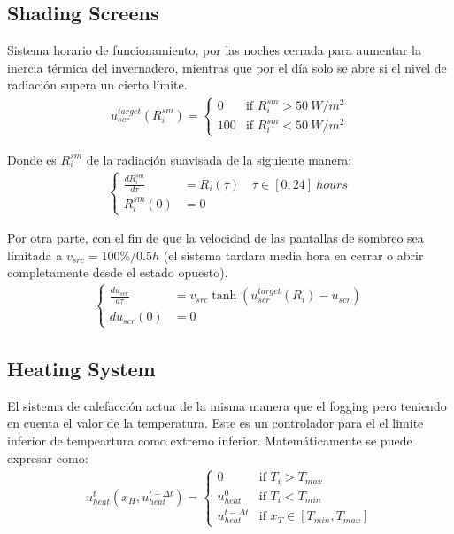 \documentclass{article}
\begin{document}
\subsection{Shading Screens} 

Sistema horario de funcionamiento, por las noches cerrada para aumentar la inercia térmica del invernadero, mientras que por el día solo se abre si el nivel de radiación supera un cierto límite.
\begin{gather}
    u_{scr}^{target}(R_i^{sm}) = \begin{cases}
        0      & \text{if }R_i^{sm} > 50 \ W/m^2 \\
        100   & \text{if }R_i^{sm}  < 50 \ W/m^2 
    \end{cases} 
\end{gather}

Donde es $R_i^{sm}$ de la radiación suavisada de la siguiente manera:
\begin{gather}
    \begin{cases}
        \displaystyle \frac{dR_i^{sm}}{d\tau} & = R_i(\tau) \hspace{1em} \tau \in [0,24]\ hours \\[5pt]
        R_i^{sm}(0)  & = 0
    \end{cases}
\end{gather}

Por otra parte, con el fin de que la velocidad de las pantallas de sombreo sea limitada a $v_{src}=100\%/0.5h$ (el sistema tardara media hora en cerrar o abrir completamente desde el estado opuesto).
\begin{gather}
    \begin{cases}
        \displaystyle \frac{du_{scr}}{d\tau} & =  v_{src}\tanh(u_{scr}^{target}(R_i)-u_{scr}) \\
        du_{scr}(0) & =  0
    \end{cases}
\end{gather}
\subsection{Heating System}

El sistema de calefacción actua de la misma manera que el fogging pero teniendo en cuenta el valor de la temperatura. Este es un controlador para el el limite inferior de tempeartura como extremo inferior. Matemáticamente se puede expresar como: 
\begin{gather}\label{eq:HeatLaw}
    u^{t}_{heat}(x_H,u^{t-\Delta t}_{heat}) = \begin{cases}
        0 & \text{if } T_i > T_{max} \\
        u^0_{heat} & \text{if } T_i < T_{min} \\
        u^{t-\Delta t}_{heat} & \text{if } x_T \in [T_{min},T_{max}]
    \end{cases} 
\end{gather}
\end{document}
